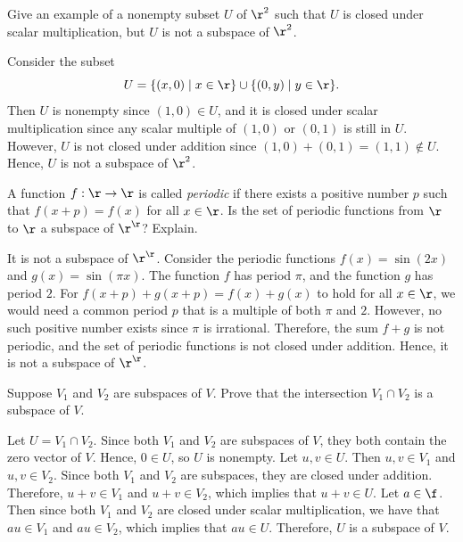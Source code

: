 \begin{exercise}[1c8]
    Give an example of a nonempty subset $U$ of $\r^2$ such that $U$ is closed under scalar multiplication, but $U$ is not a subspace of $\r^2$.
\end{exercise}

\begin{sol}
    Consider the subset
    \[U = \{(x, 0) \mid x \in \r\} \cup \{(0, y) \mid y \in \r\}.\]
    Then $U$ is nonempty since $(1, 0) \in U$, and it is closed under scalar multiplication since any scalar multiple of $(1, 0)$ or $(0, 1)$ is still in $U$. However, $U$ is not closed under addition since $(1, 0) + (0, 1) = (1, 1) \notin U$. Hence, $U$ is not a subspace of $\r^2$.
\end{sol}

\begin{exercise}[1c9]
    A function $f : \r \to \r$ is called \emph{periodic} if there exists a positive number $p$ such that $f(x + p) = f(x)$ for all $x \in \r$. Is the set of periodic functions from $\r$ to $\r$ a subspace of $\r^{\r}$? Explain.
\end{exercise}

\begin{sol}
    It is not a subspace of $\r^{\r}$. Consider the periodic functions $f(x) = \sin(2x)$ and $g(x) = \sin(\pi x)$. The function $f$ has period $\pi$, and the function $g$ has period $2$. For $f(x + p) + g(x + p) = f(x) + g(x)$ to hold for all $x \in \r$, we would need a common period $p$ that is a multiple of both $\pi$ and $2$. However, no such positive number exists since $\pi$ is irrational. Therefore, the sum $f + g$ is not periodic, and the set of periodic functions is not closed under addition. Hence, it is not a subspace of $\r^{\r}$.
\end{sol}

\begin{exercise}[1c10]
    Suppose $V_1$ and $V_2$ are subspaces of $V$. Prove that the intersection $V_1 \cap V_2$ is a subspace of $V$.
\end{exercise}

\begin{sol}
    Let $U = V_1 \cap V_2$. Since both $V_1$ and $V_2$ are subspaces of $V$, they both contain the zero vector of $V$. Hence, $0 \in U$, so $U$ is nonempty. Let $u, v \in U$. Then $u, v \in V_1$ and $u, v \in V_2$. Since both $V_1$ and $V_2$ are subspaces, they are closed under addition. Therefore, $u + v \in V_1$ and $u + v \in V_2$, which implies that $u + v \in U$. Let $a \in \f$. Then since both $V_1$ and $V_2$ are closed under scalar multiplication, we have that $au \in V_1$ and $au \in V_2$, which implies that $au \in U$. Therefore, $U$ is a subspace of $V$.
\end{sol}

